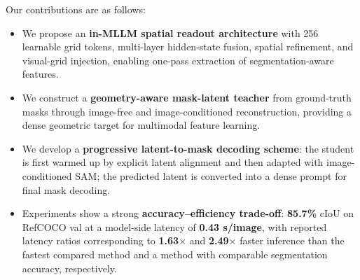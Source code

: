 Our contributions are as follows:
\begin{itemize}
    \item We propose an \textbf{in-MLLM spatial readout
		architecture} with 256 learnable grid tokens,
	multi-layer hidden-state fusion, spatial refinement,
	and visual-grid injection, enabling one-pass extraction
	of segmentation-aware features.
	
	\item We construct a \textbf{geometry-aware mask-latent
		teacher} from ground-truth masks through image-free
	and image-conditioned reconstruction, providing a dense
	geometric target for multimodal feature learning.
	
	\item We develop a \textbf{progressive latent-to-mask
		decoding scheme}: the student is first warmed up by
	explicit latent alignment and then adapted with
	image-conditioned SAM; the predicted latent is converted
	into a dense prompt for final mask decoding.
	
	\item Experiments show a strong
	\textbf{accuracy--efficiency trade-off}: \textbf{85.7\%}
	cIoU on RefCOCO val at a model-side latency of \textbf{0.43 s/image}, with reported latency ratios corresponding to \textbf{1.63$\times$} and \textbf{2.49$\times$} faster inference than the fastest compared method and a method with comparable segmentation accuracy, respectively.
\end{itemize}
